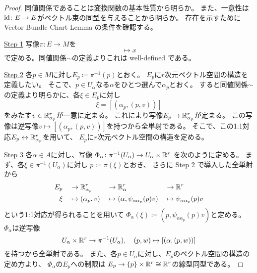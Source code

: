 \documentclass[report]{jlreq}
\begin{document}
\begin{proof}
    同値関係であることは変換関数の基本性質から明らか。
    また、一意性は$\mathrm{id} \colon E \to E$がベクトル束の同型を与えることから明らか。
    存在を示すために
    Vector Bundle Chart Lemma の条件を確認する。

    \underline{Step 1} \quad
    写像$\pi \colon E \to M$を
    \begin{equation}
        [(\alpha, (x, \xi))] \mapsto x
    \end{equation}
    で定める。同値関係$\sim$の定義よりこれは well-defined である。

    \underline{Step 2} \quad
    各$p \in M$に対し$E_p \coloneqq \pi^{-1}(p)$とおく。
    $E_p$に$r$次元ベクトル空間の構造を定義したい。
    そこで、$p \in U_\alpha$なる$\alpha$をひとつ選んで$\alpha_p$とおく。
    すると同値関係$\sim$の定義より明らかに、各$\xi \in E_p$に対し
    \begin{equation}
        \xi = [(\alpha_p, (p, v))]
    \end{equation}
    をみたす$v \in \mathbb{R}^r_{\alpha_p}$が一意に定まる。
    これにより写像$E_p \to \mathbb{R}^r_{\alpha_p}$が定まる。
    この写像は逆写像$v \mapsto [(\alpha_p, (p, v))]$を持つから全単射である。
    そこで、この1:1対応$E_p \leftrightarrow \mathbb{R}^r_{\alpha_p}$を用いて、
    $E_p$に$r$次元ベクトル空間の構造を定める。

    \underline{Step 3} \quad
    各$\alpha \in A$に対し、写像
    $\Phi_\alpha \colon \pi^{-1}(U_\alpha) \to U_\alpha \times \mathbb{R}^r$
    を次のように定める。
    まず、各$\xi \in \pi^{-1}(U_\alpha)$に対し
    $p \coloneqq \pi(\xi)$とおき、
    さらに Step 2 で導入した全単射から
    \begin{alignat}{8}
        E_p \;
            && \to & \; \mathbb{R}^r_{\alpha_p} \;
            & \to & \; \mathbb{R}^r_\alpha \;
            & \to & \; \mathbb{R}^r \\
        \xi \;
            && \mapsto & \; (\alpha_p, v) \;
            & \mapsto & \; (\alpha, \psi_{\alpha\alpha_p}(p) v) \;
            & \mapsto & \; \psi_{\alpha\alpha_p}(p) v
    \end{alignat}
    という1:1対応が得られることを用いて
    $\Phi_\alpha(\xi) \coloneqq (p, \psi_{\alpha\alpha_p}(p) v)$と定める。
    $\Phi_\alpha$は逆写像
    \begin{equation}
        U_\alpha \times \mathbb{R}^r \to \pi^{-1}(U_\alpha),
        \quad
        (p, w) \mapsto [(\alpha, (p, w))]
    \end{equation}
    を持つから全単射である。
    また、各$p \in U_\alpha$に対し、$E_p$のベクトル空間の構造の定め方より、
    $\Phi_\alpha$の$E_p$への制限は
    $E_p \to \{p\} \times \mathbb{R}^r \cong \mathbb{R}^r$の線型同型である。


\end{proof}
\end{document}
